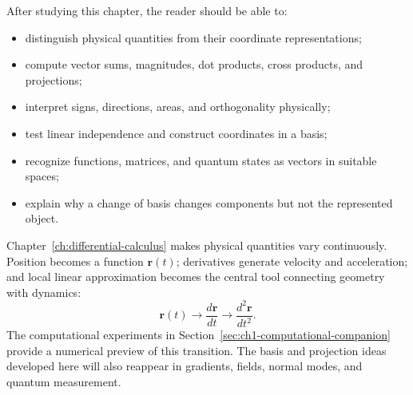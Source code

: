 \chapteroutcomesheading
\begin{outcomesbox}
After studying this chapter, the reader should be able to:
\begin{itemize}
\item distinguish physical quantities from their coordinate representations;
\item compute vector sums, magnitudes, dot products, cross products, and projections;
\item interpret signs, directions, areas, and orthogonality physically;
\item test linear independence and construct coordinates in a basis;
\item recognize functions, matrices, and quantum states as vectors in suitable spaces;
\item explain why a change of basis changes components but not the represented object.
\end{itemize}
\end{outcomesbox}

\chapterlookaheadheading
\begin{lookingaheadbox}
Chapter~\ref{ch:differential-calculus} makes physical quantities vary continuously. Position becomes a function $\mathbf r(t)$; derivatives generate velocity and acceleration; and local linear approximation becomes the central tool connecting geometry with dynamics:
\[
\mathbf r(t)
\longrightarrow
\frac{d\mathbf r}{dt}
\longrightarrow
\frac{d^2\mathbf r}{dt^2}.
\]
The computational experiments in Section~\ref{sec:ch1-computational-companion} provide a numerical preview of this transition. The basis and projection ideas developed here will also reappear in gradients, fields, normal modes, and quantum measurement.
\end{lookingaheadbox}
